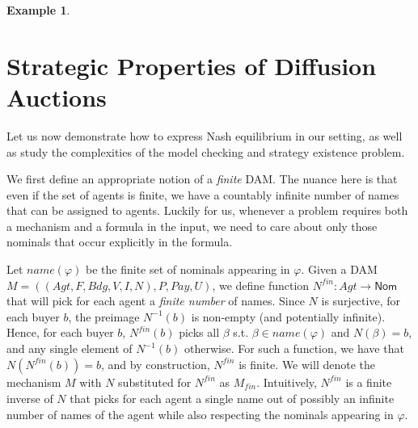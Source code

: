 \documentclass[letterpaper]{article} %
\theoremstyle{definition}
\newtheorem{example}{Example}
\newcommand{\Pay}{\mathit{Pay}}
\newcommand{\Nfin}{N^{\mathit{fin}}}
\newcommand{\Mfin}{M_{\mathit{fin}}}
\newcommand{\munyque}[1]{{[\color{red}#1]}}
\begin{document}
\begin{example}
    

\end{example}

\section{Strategic Properties of Diffusion Auctions}
Let us now demonstrate how to express Nash equilibrium in our setting, as well as study the complexities of the model checking and strategy existence problem. 

We first define an appropriate notion of a \textit{finite} DAM. The nuance here is that even if the set of agents is finite, we have a countably infinite number of names that can be assigned to agents. Luckily for us, whenever a problem requires both a mechanism and a formula in the input, we need to care about only those nominals that occur explicitly in the formula. 

Let $name (\varphi) $ be the finite set of nominals appearing in $\varphi$. %
Given a DAM $M = ((Agt, F, Bdg, V, I, N), P, \Pay, U)$, we define %
function $\Nfin: Agt \to \mathsf{Nom}$ that will pick for each agent a \textit{finite number} of names. Since $N$ is surjective, for each buyer $b$, the preimage $N^{-1} (b)$ is non-empty (and potentially infinite). Hence, for each buyer $b$, $\Nfin(b)$ picks all $\beta$ s.t. $\beta \in name(\varphi)$ and $N(\beta) = b$, and any single element of $N^{-1} (b)$ otherwise. For such a function, we have that $N(\Nfin (b)) = b$, and by construction, $\Nfin$ is finite. We will denote the mechanism $M$ with $N$ substituted for $\Nfin$ as $\Mfin$.
Intuitively, $\Nfin$ is a finite inverse of $N$ that picks for each agent a single name out of possibly an infinite number of names of the agent while also respecting the nominals appearing %
in $\varphi$.
\end{document}
